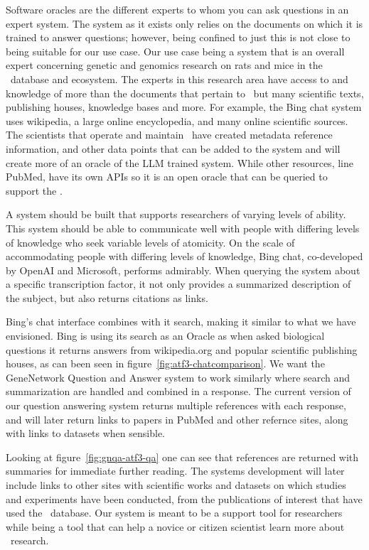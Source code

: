 Software oracles are the different experts to whom you can ask questions in an expert system.
The system as it exists only relies on the documents on which it is trained to answer questions; however, being confined to just this is not close to being suitable for our use case.
Our use case being a system that is an overall expert concerning genetic and genomics research on rats and mice in the \GN\ database and ecosystem.
The experts in this research area have access to and knowledge of more than the documents that pertain to \GN\ but many scientific texts, publishing houses, knowledge bases and more.
For example, the Bing chat system uses wikipedia, a large online encyclopedia, and many online scientific sources.
The scientists that operate and maintain \GN\ have created metadata reference information, and other data points that can be added to the system and will create more of an oracle of the LLM trained system.
While other resources, line PubMed, have its own APIs so it is an open oracle that can be queried to support the \project.

A system should be built that supports researchers of varying levels of ability.
This system should be able to communicate well with people with differing levels of knowledge who seek variable levels of atomicity.
On the scale of accommodating people with differing levels of knowledge, Bing chat, co-developed by OpenAI and Microsoft, performs admirably.
When querying the system about a specific transcription factor, it not only provides a summarized description of the subject, but also returns citations as links.



Bing's chat interface combines with it search, making it similar to what we have envisioned. 
Bing is using its search as an Oracle as when asked biological questions it returns answers from wikipedia.org and popular scientific publishing houses, as can been seen in figure~\ref{fig:atf3-chatcomparison}.
We want the GeneNetwork Question and Answer system to work similarly where search and summarization are handled and combined in a response.
The current version of our question answering system returns multiple references with each response, and will later return links to papers in PubMed and other refernce sites, along with links to datasets when sensible.



Looking at figure~\ref{fig:gnqa-atf3-qa} one can see that references are returned with summaries for immediate further reading.
The systems development will later include links to other sites with scientific works and datasets on which studies and experiments have been conducted, from the publications of interest that have used the \GN\ database.
Our system is meant to be a support tool for researchers while being a tool that can help a novice or citizen scientist learn more about \GN\ research.